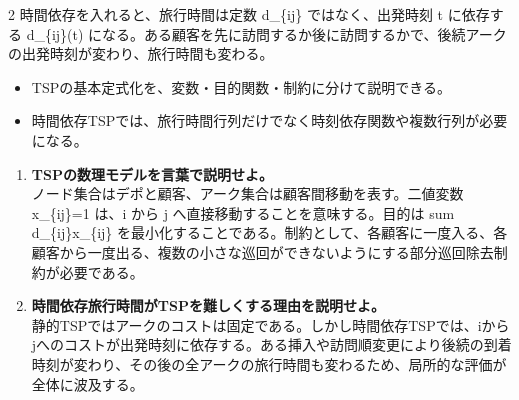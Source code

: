 \begin{multicols}{2}
時間依存を入れると、旅行時間は定数 d\_\{ij\} ではなく、出発時刻 t に依存する d\_\{ij\}(t) になる。ある顧客を先に訪問するか後に訪問するかで、後続アークの出発時刻が変わり、旅行時間も変わる。\par
{}
\begin{itemize}
\item TSPの基本定式化を、変数・目的関数・制約に分けて説明できる。
\item 時間依存TSPでは、旅行時間行列だけでなく時刻依存関数や複数行列が必要になる。
\end{itemize}
\begin{enumerate}
\item \textbf{TSPの数理モデルを言葉で説明せよ。}\\ノード集合はデポと顧客、アーク集合は顧客間移動を表す。二値変数 x\_\{ij\}=1 は、i から j へ直接移動することを意味する。目的は sum d\_\{ij\}x\_\{ij\} を最小化することである。制約として、各顧客に一度入る、各顧客から一度出る、複数の小さな巡回ができないようにする部分巡回除去制約が必要である。
\item \textbf{時間依存旅行時間がTSPを難しくする理由を説明せよ。}\\静的TSPではアークのコストは固定である。しかし時間依存TSPでは、iからjへのコストが出発時刻に依存する。ある挿入や訪問順変更により後続の到着時刻が変わり、その後の全アークの旅行時間も変わるため、局所的な評価が全体に波及する。
\end{enumerate}
\end{multicols}

